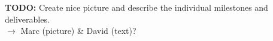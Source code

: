 \textbf{TODO:} Create nice picture and describe the individual milestones and deliverables. \\ 
$\rightarrow$ Marc (picture) \& David (text)?